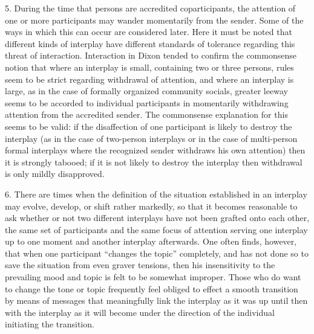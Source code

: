 \documentclass[openany,nobib]{tufte-book}
\begin{document}
5. During the time that persons are accredited coparticipants, the
attention of one or more participants may wander momentarily from the
sender. Some of the ways in which this can occur are considered later.
Here it must be noted that different kinds of interplay have different
standards of tolerance regarding this threat of interaction. Interaction
in Dixon tended to confirm the commonsense notion that where an
interplay is small, containing two or three persons, rules seem to be
strict regarding withdrawal of attention, and where an interplay is
large, as in the case of formally organized community socials, greater
leeway seems to be accorded to individual participants in momentarily
withdrawing attention from the accredited sender. The commonsense
explanation for this seems to be valid: if the disaffection of one
participant is likely to destroy the interplay (as in the case of
two-person interplays or in the case of multi-person formal interplays
where the recognized sender withdraws his own attention) then it is
strongly tabooed; if it is not likely to destroy the interplay then
withdrawal is only mildly disapproved.

6. There are times when the definition of the situation established in
an interplay may evolve, develop, or shift rather markedly, so that it
becomes reasonable to ask whether or not two different interplays have
not been grafted onto each other, the same set of participants and the
same focus of attention serving one interplay up to one moment and
another interplay afterwards. One often finds, however, that when one
participant ``changes the topic'' completely, and has not done so to
save the situation from even graver tensions, then his insensitivity to
the prevailing mood and topic is felt to be somewhat improper. Those who
do want to change the tone or topic frequently feel obliged to effect a
smooth transition by means of messages that meaningfully link the
interplay as it was up until then with the interplay as it will become
under the direction of the individual initiating the transition.
\end{document}
